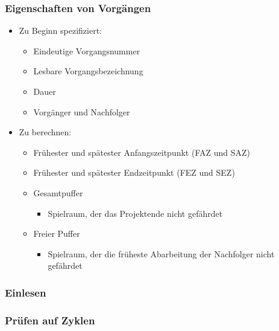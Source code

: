 \documentclass[ngerman, t]{beamer}
\begin{document}
\begin{frame}
  \frametitle{Eigenschaften von Vorg\"angen}
  \begin{itemize}
    \item Zu Beginn spezifiziert:
      \begin{itemize}
        \item Eindeutige Vorgangsnummer
        \item Lesbare Vorgangsbezeichnung
        \item Dauer
        \item Vorg\"anger und Nachfolger
      \end{itemize}
    \item Zu berechnen:
      \begin{itemize}
        \item Fr\"uhester und sp\"atester Anfangszeitpunkt (FAZ und SAZ)
        \item Fr\"uhester und sp\"atester Endzeitpunkt (FEZ und SEZ)
        \item Gesamtpuffer
          \begin{itemize}
            \item Spielraum, der das Projektende nicht gef\"ahrdet
          \end{itemize}
        \item Freier Puffer
          \begin{itemize}
            \item Spielraum, der die fr\"uheste Abarbeitung der Nachfolger
              nicht gef\"ahrdet
          \end{itemize}
      \end{itemize}
  \end{itemize}
\end{frame}

\begin{frame}
  \frametitle{Einlesen}
  \begin{figure}
    \resizebox{!}{100px}{}
  \end{figure}
\end{frame}

\begin{frame}
  \frametitle{Pr\"ufen auf Zyklen}
  \begin{figure}
    \resizebox{!}{100px}{}
  \end{figure}
\end{frame}
\end{document}
